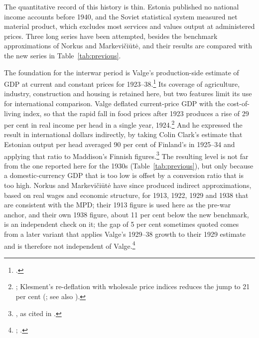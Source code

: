 \documentclass[12pt,a4paper]{article}
\begin{document}
The quantitative record of this history is thin. Estonia published no national income accounts before 1940, and the Soviet statistical system measured net material product, which excludes most services and values output at administered prices. Three long series have been attempted, besides the benchmark approximations of Norkus and Markevi\v{c}i\={u}t\.{e}, and their results are compared with the new series in Table~\ref{tab:previous}.



The foundation for the interwar period is Valge's production-side estimate of GDP at current and constant prices for 1923--38.\footnote{\autocite{valge2003all}.} Its coverage of agriculture, industry, construction and housing is retained here, but two features limit its use for international comparison. Valge deflated current-price GDP with the cost-of-living index, so that the rapid fall in food prices after 1923 produces a rise of 29 per cent in real income per head in a single year, 1924.\footnote{\autocite[2716, 2718, 2721]{valge2003all}; Klesment's re-deflation with wholesale price indices reduces the jump to 21 per cent (\autocite[37--8]{klesment2010}; see also \autocite[29--31]{klesment2008a}).} And he expressed the result in international dollars indirectly, by taking Colin Clark's estimate that Estonian output per head averaged 90 per cent of Finland's in 1925--34 and applying that ratio to Maddison's Finnish figures.\footnote{\autocite{clark1938}, as cited in \autocite[2725--6]{valge2003all}.} The resulting level is not far from the one reported here for the 1930s (Table~\ref{tab:previous}), but only because a domestic-currency GDP that is too low is offset by a conversion ratio that is too high. Norkus and Markevi\v{c}i\={u}t\.{e} have since produced indirect approximations, based on real wages and economic structure, for 1913, 1922, 1929 and 1938 that are consistent with the MPD; their 1913 figure is used here as the pre-war anchor, and their own 1938 figure, about 11 per cent below the new benchmark, is an independent check on it; the gap of 5 per cent sometimes quoted comes from a later variant that applies Valge's 1929--38 growth to their 1929 estimate and is therefore not independent of Valge.\footnote{\autocite{norkusmark2021}; \autocite[128--30, 154]{norkus_restorations}.}
\end{document}
